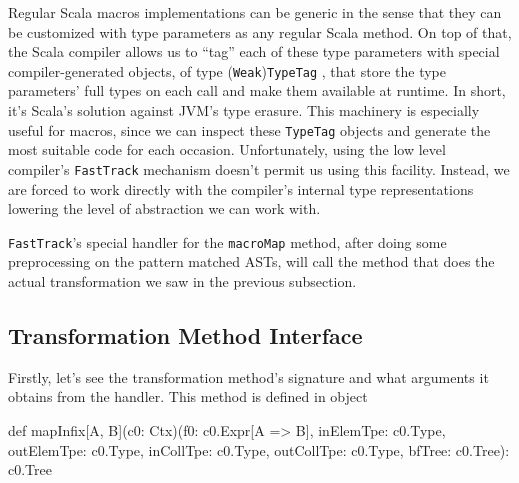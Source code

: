 Regular Scala macros implementations can be generic in the sense that they can
be customized with type parameters as any regular Scala method. On top of that,
the Scala compiler allows us to ``tag'' each of these type parameters with
special compiler-generated objects, of type (\texttt{Weak})\texttt{TypeTag} , that store the
type parameters' full types on each call and make them available at runtime. In
short, it's Scala's solution against JVM's type erasure. This machinery is
especially useful for macros, since we can inspect these \texttt{TypeTag} objects and
generate the most suitable code for each occasion. Unfortunately, using the low
level compiler's \texttt{FastTrack} mechanism doesn't permit us using this facility.
Instead, we are forced to work directly with the compiler's internal type
representations lowering the level of abstraction we can work with.

\texttt{FastTrack}'s special handler for the \texttt{macroMap} method, after
doing some preprocessing on the pattern matched ASTs, will call the method
that does the actual transformation we saw in the previous subsection. 


\subsection{Transformation Method Interface}

Firstly, let's see the transformation method's signature and what arguments it
obtains from the handler. This method is defined in
 object 

\begin{scalaCode}
def mapInfix[A, B](c0: Ctx)(f0: c0.Expr[A => B], inElemTpe: c0.Type, outElemTpe: c0.Type, inCollTpe: c0.Type, outCollTpe: c0.Type, bfTree: c0.Tree): c0.Tree
\end{scalaCode}

